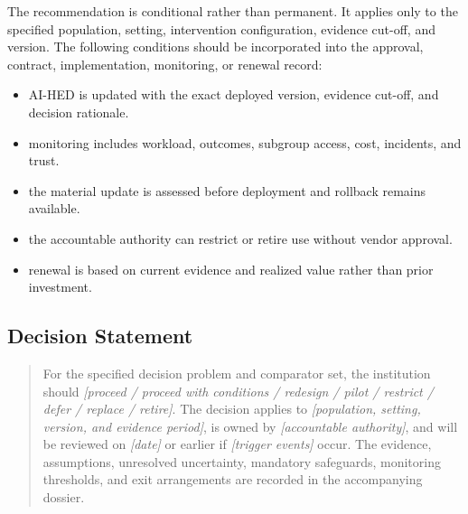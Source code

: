 The recommendation is conditional rather than permanent. It applies only to the
specified population, setting, intervention configuration, evidence cut-off, and
version. The following conditions should be incorporated into the approval,
contract, implementation, monitoring, or renewal record:

\begin{itemize}
 \item AI-HED is updated with the exact deployed version, evidence cut-off, and decision rationale.
 \item monitoring includes workload, outcomes, subgroup access, cost, incidents, and trust.
 \item the material update is assessed before deployment and rollback remains available.
 \item the accountable authority can restrict or retire use without vendor approval.
 \item renewal is based on current evidence and realized value rather than prior investment.
\end{itemize}

\subsection{Decision Statement}
\begin{quote}
For the specified decision problem and comparator set, the institution should
\emph{[proceed / proceed with conditions / redesign / pilot / restrict / defer /
replace / retire]}. The decision applies to \emph{[population, setting, version,
and evidence period]}, is owned by \emph{[accountable authority]}, and will be
reviewed on \emph{[date]} or earlier if \emph{[trigger events]} occur. The
evidence, assumptions, unresolved uncertainty, mandatory safeguards, monitoring
thresholds, and exit arrangements are recorded in the accompanying dossier.
\end{quote}
